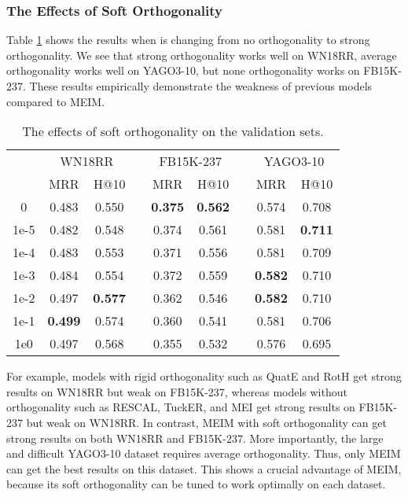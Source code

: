 \documentclass{article}
\theoremstyle{plain}
\theoremstyle{remark}
\begin{document}
\subsubsection{The Effects of Soft Orthogonality}
Table \ref{tab:ablation_ortho} shows the results when  is changing from no orthogonality to strong orthogonality. We see that strong orthogonality works well on WN18RR, average orthogonality works well on YAGO3-10, but none orthogonality works on FB15K-237. These results empirically demonstrate the weakness of previous models compared to MEIM. 

\begin{table}[t]
	\centering  
	\begin{adjustbox}{max width=\linewidth}
		\begin{tabular}{@{\extracolsep{-2pt}}ccclcclcc}


			& \multicolumn{2}{c}{WN18RR} && \multicolumn{2}{c}{FB15K-237} && \multicolumn{2}{c}{YAGO3-10} \\
			\cmidrule{2-3} \cmidrule{5-6} \cmidrule{8-9}
			 & MRR & H@10 && MRR & H@10 && MRR & H@10 \\
\cmidrule{1-3} \cmidrule{5-6} \cmidrule{8-9}
			
			0 & 0.483 & 0.550 && \textbf{0.375} & \textbf{0.562} && 0.574 & 0.708 \\ 1e-5 & 0.482 & 0.548 && 0.374 & 0.561 && 0.581 & \textbf{0.711} \\ 1e-4 & 0.483 & 0.553 && 0.371 & 0.556 && 0.581 & 0.709 \\ 1e-3 & 0.484 & 0.554 && 0.372 & 0.559 && \textbf{0.582} & 0.710 \\ 1e-2 & 0.497 & \textbf{0.577} && 0.362 & 0.546 && \textbf{0.582} & 0.710 \\ 1e-1 & \textbf{0.499} & 0.574 && 0.360 & 0.541 && 0.581 & 0.706 \\ 1e0 & 0.497 & 0.568 && 0.355 & 0.532 && 0.576 & 0.695 \\ 

\end{tabular}
	\end{adjustbox}
	\caption[]{The effects of soft orthogonality on the validation sets.}
	\label{tab:ablation_ortho}
\end{table}

For example, models with rigid orthogonality such as QuatE and RotH get strong results on WN18RR but weak on FB15K-237, whereas models without orthogonality such as RESCAL, TuckER, and MEI get strong results on FB15K-237 but weak on WN18RR. In contrast, MEIM with soft orthogonality can get strong results on both WN18RR and FB15K-237. More importantly, the large and difficult YAGO3-10 dataset requires average orthogonality. Thus, only MEIM can get the best results on this dataset. This shows a crucial advantage of MEIM, because its soft orthogonality can be tuned to work optimally on each dataset.
\end{document}
